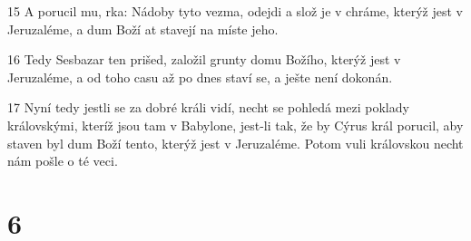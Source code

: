 \par 15 A porucil mu, rka: Nádoby tyto vezma, odejdi a slož je v chráme, kterýž jest v Jeruzaléme, a dum Boží at stavejí na míste jeho.
\par 16 Tedy Sesbazar ten prišed, založil grunty domu Božího, kterýž jest v Jeruzaléme, a od toho casu až po dnes staví se, a ješte není dokonán.
\par 17 Nyní tedy jestli se za dobré králi vidí, necht se pohledá mezi poklady královskými, kteríž jsou tam v Babylone, jest-li tak, že by Cýrus král porucil, aby staven byl dum Boží tento, kterýž jest v Jeruzaléme. Potom vuli královskou necht nám pošle o té veci.

\chapter{6}

